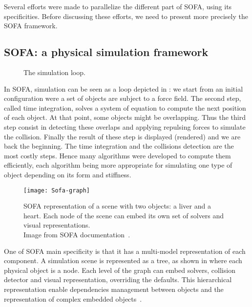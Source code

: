 Several efforts were made to parallelize the different part of \gls{SOFA}, using its specificities.
Before discussing these efforts, we need to present more precisely the \gls{SOFA} framework.

\subsection{SOFA: a physical simulation framework}

\begin{figure}[htb]
    \centering
    
    \caption{The simulation loop.}
    \label{fig:simu-pipeline}
\end{figure}

In \gls{SOFA}, simulation can be seen as a loop depicted in : we start from an initial configuration were a set of objects are subject to a force field.
The second step, called time integration, solves a system of equation to compute the next position of each object.
At that point, some objects might be overlapping.
Thus the third step consist in detecting these overlaps and applying repulsing forces to simulate the collision.
Finally the result of these step is displayed (rendered) and we are back the beginning.
The time integration and the collisions detection are the most costly steps.
Hence many algorithms  were developed to compute them efficiently,  each algorithm being more appropriate for simulating one type of object depending on its form and stiffness.

\begin{figure}[htb]
    \centering
    \texttt{[image: Sofa-graph]}
    \caption[Example of SOFA scene graph.]{SOFA representation of a scene with two objects: a liver and a
        heart. Each node of the scene can embed its own set of solvers and
        visual representations.\\
        Image from SOFA documentation~\cite{SOFA16Sofa}.}
    \label{fig:sofa-tree}
\end{figure}

One of \gls{SOFA} main specificity is that it has a multi-model representation of each component.
A simulation scene is represented as a tree, as shown in  where each physical object is a node.
Each level of the graph can embed solvers, collision detector and visual representation, overriding the defaults.
This hierarchical representation enable dependencies management between objects and the representation of complex embedded objects~\cite{Nesme09Preserving,Faure11Sparse}.

